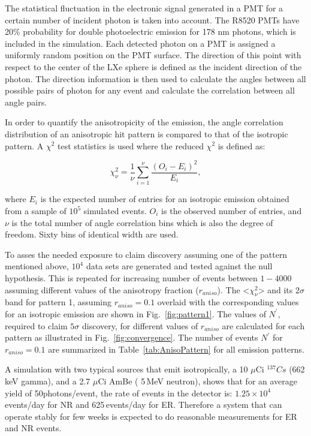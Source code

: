 The statistical fluctuation 
in the electronic signal generated in a PMT for a certain number of incident photon is 
taken into account. The R8520 PMTs have 20\% probability 
for double photoelectric emission for 178 nm photons, which is included in the simulation.
Each detected photon on a PMT is assigned a uniformly random position on the PMT surface. 
The direction of this point with respect 
to the center of the LXe sphere is defined as the incident direction of the photon. The direction information 
is then used to calculate the angles between all possible pairs of photon for any event and 
calculate the correlation between all angle pairs. 

In order to quantify the anisotropicity of the emission, 
the angle correlation distribution of an anisotropic hit pattern is compared to that of the isotropic 
pattern. A $\chi^2$ test statistics is used where the reduced $\chi^2$ is defined as: 

\begin{equation}
\chi^2_\nu = \frac{1}{\nu} \sum^{\nu}_{i=1} \frac{(O_i - E_i)^2}{E_i},
\label{redchi2}
\end{equation}

where $E_i$ is the expected number of entries for an isotropic emission obtained from a sample of $10^5$ simulated events. 
$O_i$ is the observed number of entries, and $\nu$ is the total number of angle correlation bins 
which is also the degree of freedom. Sixty bins of identical width are used.


To asses the needed exposure to claim discovery assuming one of the   pattern mentioned above, $10^4$ data sets are generated and tested against the null hypothesis. This is repeated for increasing number of events between $1-4000$ assuming different values of the anisotropy fraction ($r_{aniso}$). The <$\chi^2_\nu$> 
and its 2$\sigma$ band for pattern 1, assuming $r_{aniso} =0.1$ overlaid with the corresponding values  for an isotropic emission are shown in Fig.~\ref{fig:pattern1}.  
The values of $N^{'}$, required to claim $5\sigma$ discovery, for different values of $r_{aniso}$ are calculated for each pattern as illustrated in Fig.~\ref{fig:convergence}.
The number of events 
$N^{'}$ for $r_{aniso} =0.1$ are summarized in Table~\ref{tab:AnisoPattern} for all emission patterns.

A simulation with two typical sources that emit isotropically, a 10 $\mu$Ci $^{137}Cs$ (662\,keV gamma), and a 2.7 $\mu$Ci AmBe ( 5\,MeV neutron), shows that for an average yield of 
50photons/event,  the rate of events in the detector is: $1.25\times10^{4}$\,events/day for NR and 625\,events/day for ER. 
Therefore a system that can operate stably for few weeks 
is expected to do reasonable measurements for ER and NR events.


